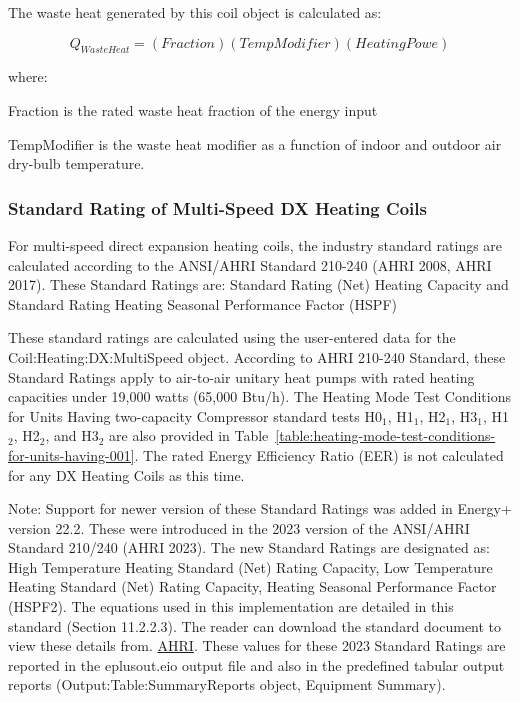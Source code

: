 The waste heat generated by this coil object is calculated as:

\begin{equation}
{Q_{WasteHeat}} = (Fraction)(TempModifier)(HeatingPowe)
\end{equation}

where:

Fraction is the rated waste heat fraction of the energy input

TempModifier is the waste heat modifier as a function of indoor and outdoor air dry-bulb temperature.

\subsubsection{Standard Rating of Multi-Speed DX Heating Coils}\label{standard-rating-of-multi-speed-dx-heating-coils}

For multi-speed direct expansion heating coils, the industry standard ratings are calculated according to the ANSI/AHRI Standard 210-240 (AHRI 2008, AHRI 2017).  These Standard Ratings are: Standard Rating (Net) Heating Capacity and Standard Rating Heating Seasonal Performance Factor (HSPF)

These standard ratings are calculated using the user-entered data for the Coil:Heating:DX:MultiSpeed object. According to AHRI 210-240 Standard, these Standard Ratings apply to air-to-air unitary heat pumps with rated heating capacities under 19,000 watts (65,000 Btu/h). The Heating Mode Test Conditions for Units Having two-capacity Compressor standard tests H0\(_{1}\), H1\(_{1}\), H2\(_{1}\), H3\(_{1}\), H1\(_{2}\), H2\(_{2}\), and H3\(_{2}\) are also provided in Table~\ref{table:heating-mode-test-conditions-for-units-having-001}. The rated Energy Efficiency Ratio (EER) is not calculated for any DX Heating Coils as this time.

Note: Support for newer version of these Standard Ratings was added in Energy+ version 22.2.  These were introduced in the 2023 version of the ANSI/AHRI Standard 210/240 (AHRI 2023).  The new Standard Ratings are designated as: High Temperature Heating Standard (Net) Rating Capacity, Low Temperature Heating Standard (Net) Rating Capacity, Heating Seasonal Performance Factor (HSPF2).
The equations used in this implementation are detailed in this standard (Section 11.2.2.3).  The reader can download the standard document to view these details from. \href{https://www.ahrinet.org/App_Content/ahri/files/STANDARDS/AHRI/AHRI_Standard_210-240_2023.pdf}{AHRI}.
These values for these 2023 Standard Ratings are reported in the eplusout.eio output file and also in the predefined tabular output reports (Output:Table:SummaryReports object, Equipment Summary).

